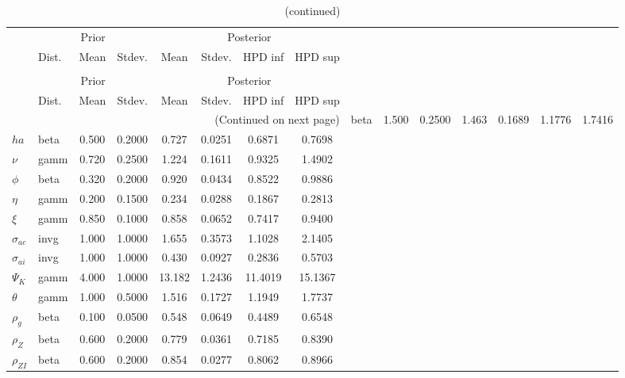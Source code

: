  
\begin{center}
\begin{longtable}{llcccccc} 
\caption{Results from Metropolis-Hastings (parameters)}
 \label{Table:MHPosterior:1}\\
\toprule 
  & \multicolumn{3}{c}{Prior}  &  \multicolumn{4}{c}{Posterior} \\
  \cmidrule(r{.75em}){2-4} \cmidrule(r{.75em}){5-8}
  & Dist. & Mean  & Stdev. & Mean & Stdev. & HPD inf & HPD sup\\
\midrule \endfirsthead 
\caption{(continued)}\\\toprule 
  & \multicolumn{3}{c}{Prior}  &  \multicolumn{4}{c}{Posterior} \\
  \cmidrule(r{.75em}){2-4} \cmidrule(r{.75em}){5-8}
  & Dist. & Mean  & Stdev. & Mean & Stdev. & HPD inf & HPD sup\\
\midrule \endhead 
\bottomrule \multicolumn{8}{r}{(Continued on next page)} \endfoot 
\bottomrule \endlastfoot 
${\sigma}$ & beta &   1.500 & 0.2500 &   1.463& 0.1689 &  1.1776 &  1.7416 \\ 
${ha}$ & beta &   0.500 & 0.2000 &   0.727& 0.0251 &  0.6871 &  0.7698 \\ 
$\nu$ & gamm &   0.720 & 0.2500 &   1.224& 0.1611 &  0.9325 &  1.4902 \\ 
${\phi}$ & beta &   0.320 & 0.2000 &   0.920& 0.0434 &  0.8522 &  0.9886 \\ 
${\eta}$ & gamm &   0.200 & 0.1500 &   0.234& 0.0288 &  0.1867 &  0.2813 \\ 
$\xi$ & gamm &   0.850 & 0.1000 &   0.858& 0.0652 &  0.7417 &  0.9400 \\ 
${\sigma_{ac}}$ & invg &   1.000 & 1.0000 &   1.655& 0.3573 &  1.1028 &  2.1405 \\ 
${\sigma_{ai}}$ & invg &   1.000 & 1.0000 &   0.430& 0.0927 &  0.2836 &  0.5703 \\ 
${\Psi_{K}}$ & gamm &   4.000 & 1.0000 &  13.182& 1.2436 & 11.4019 & 15.1367 \\ 
${\theta}$ & gamm &   1.000 & 0.5000 &   1.516& 0.1727 &  1.1949 &  1.7737 \\ 
${\rho_g}$ & beta &   0.100 & 0.0500 &   0.548& 0.0649 &  0.4489 &  0.6548 \\ 
${\rho_Z}$ & beta &   0.600 & 0.2000 &   0.779& 0.0361 &  0.7185 &  0.8390 \\ 
${\rho_{ZI}}$ & beta &   0.600 & 0.2000 &   0.854& 0.0277 &  0.8062 &  0.8966 \\ 

\end{longtable}
\end{center}
